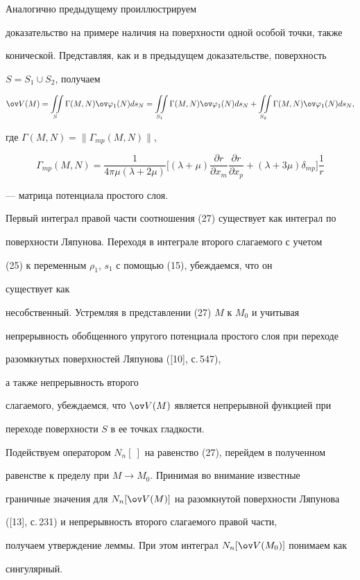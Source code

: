 \begin{pf} 


Аналогично предыдущему проиллюстрируем  


доказательство на примере наличия на поверхности одной особой точки, также  


конической. Представляя, как и в предыдущем доказательстве, поверхность  


$S=S_1\cup S_2$, получаем 


\begin{equation} 


\ov V(M)=\iint\limits_S \Gamma(M,N)\ov\varphi_1(N)ds_N= 


\iint\limits_{S_1}\Gamma(M,N)\ov\varphi_1(N)ds_N+ 


\iint\limits_{S_2}\Gamma(M,N)\ov\varphi_1(N)ds_N, 


\end{equation} 


где $\Gamma(M,N)=\|\Gamma_{mp}(M,N)\|$, 


$$ 


\Gamma_{mp}(M,N)=\frac{1}{4\pi\mu(\lambda+2\mu)}\bigg[(\lambda+\mu) 


\frac{\partial r}{\partial x_m}\frac{\partial r}{\partial x_p} 


+(\lambda+3\mu)\delta_{mp}\bigg]\frac{1}{r} 


$$ 


--- матрица потенциала простого слоя. 


Первый интеграл правой части соотношения (27) существует как интеграл по  


поверхности Ляпунова. Переходя в интеграле второго слагаемого с учетом  


(25) к переменным $\rho_1$, $s_1$ с помощью (15), убеждаемся, что он 


существует как  


несобственный. Устремляя в представлении (27) $M$ к $M_0$ и учитывая  


непрерывность обобщенного упругого потенциала простого слоя при переходе  


разомкнутых поверхностей Ляпунова ([10], с.\,547), 


а также непрерывность второго  


слагаемого, убеждаемся, что $\ov V(M)$ является непрерывной функцией при  


переходе поверхности $S$ в ее точках гладкости. 


 


Подействуем оператором $N_n[\ ]$ на равенство (27), перейдем в полученном  


равенстве к пределу при $M\to M_0$. Принимая во внимание известные  


граничные значения для $N_n[\ov V(M)]$ на разомкнутой поверхности Ляпунова 


([13], с.\,231) и непрерывность второго слагаемого правой части, 


получаем утверждение леммы. При этом интеграл $N_n[\ov V(M_0)]$ понимаем как  


сингулярный. 


\end{pf} 


